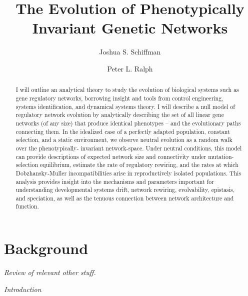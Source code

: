 \documentclass[11 pt]{article}
\newcommand{\plr}[1]{{\color{blue}\it #1}}
\newcommand{\jss}[1]{{\color{olive}\it #1}}
\begin{document}


\title{The Evolution of Phenotypically Invariant Genetic Networks}
\author[1]{Joshua S. Schiffman}
\author[1,2]{Peter L. Ralph}
\maketitle

\begin{abstract}
I will outline an analytical theory to study the evolution of biological systems such as gene regulatory networks, borrowing insight and tools from control engineering, systems identification, and dynamical systems theory. I will describe a null model of regulatory network evolution by analytically describing the set of all linear gene networks (of any size) that produce identical phenotypes -- and the evolutionary paths connecting them. In the idealized case of a perfectly adapted population, constant selection, and a static environment, we observe neutral evolution as a random walk over the phenotypically- invariant network-space. Under neutral conditions, this model can provide descriptions of expected network size and connectivity under mutation-selection equilibrium, estimate the rate of regulatory rewiring, and the rates at which Dobzhansky-Muller incompatibilities arise in reproductively isolated populations. This analysis provides insight into the mechanisms and parameters important for understanding developmental systems drift, network rewiring, evolvability, epistasis, and speciation, as well as the tenuous connection between network architecture and function. 
\end{abstract}


\section{Background} \label{sec:intro}

\plr{Review of relevant other stuff.}

\jss{Introduction}
\end{document}
